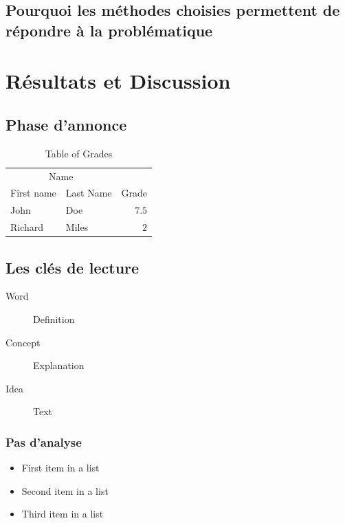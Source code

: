 \documentclass[fleqn,10pt]{SelfArx} %
\begin{document}
\subsection{Pourquoi les méthodes choisies permettent de répondre à la problématique}


\section{Résultats et Discussion}

\lipsum[10] %

\subsection{Phase d'annonce}

\lipsum[11] %

\begin{table}[hbt]
\caption{Table of Grades}
\centering
\begin{tabular}{llr}
\toprule
\multicolumn{2}{c}{Name} \\
\cmidrule(r){1-2}
First name & Last Name & Grade \\
\midrule
John & Doe & $7.5$ \\
Richard & Miles & $2$ \\
\bottomrule
\end{tabular}
\label{tab:label}
\end{table}

\subsection{Les clés de lecture}

\lipsum[12] %

\begin{description}
\item[Word] Definition
\item[Concept] Explanation
\item[Idea] Text
\end{description}

\subsubsection{Pas d'analyse}

\lipsum[13] %

\begin{itemize}[noitemsep] %
\item First item in a list
\item Second item in a list
\item Third item in a list
\end{itemize}
\end{document}
